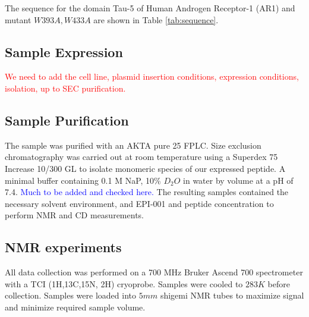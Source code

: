 The sequence for the domain Tau-5 of Human Androgen Receptor-1 (AR1) and mutant $W393A,W433A$ are shown in Table \ref{tab:sequence}. 



\subsection{Sample Expression}
\textcolor{red}{We need to add the cell line, plasmid insertion conditions, expression conditions, isolation, up to SEC purification.}


\subsection{Sample Purification}
The sample was purified with an AKTA pure 25 FPLC. 
Size exclusion chromatography was carried out at room temperature using a Superdex 75 Increase 10/300 GL to isolate monomeric species of our expressed peptide. 
A minimal buffer containing 0.1 M NaP, 10\% $D_2O$ in water by volume at a pH of 7.4. \textcolor{blue}{Much to be added and checked here. }
The resulting samples contained the necessary solvent environment, and EPI-001 and peptide concentration to perform NMR and CD measurements. 

\subsection{NMR experiments}
All data collection was performed on a 700 MHz Bruker Ascend 700 spectrometer with a TCI (1H,13C,15N, 2H) cryoprobe. Samples were cooled to $283K$ before collection. Samples were loaded into $5mm$ shigemi NMR tubes to maximize signal and minimize required sample volume. 